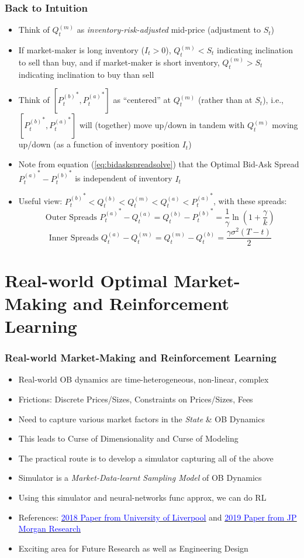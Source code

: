 \documentclass[handout]{beamer}
\begin{document}
\begin{frame}
\frametitle{Back to Intuition}
\pause
\begin{itemize}[<+->]
\item Think of $Q_t^{(m)}$ as {\em inventory-risk-adjusted} mid-price (adjustment to $S_t$)
\item If market-maker is long inventory ($I_t > 0$), $Q_t^{(m)} < S_t$ indicating inclination to sell than buy, and if market-maker is short inventory, $Q_t^{(m)} > S_t$ indicating inclination to buy than sell
\item Think of $[{P_t^{(b)}}^*, {P_t^{(a)}}^*]$ as ``centered'' at $Q_t^{(m)}$ (rather than at $S_t$), i.e., $[{P_t^{(b)}}^*, {P_t^{(a)}}^*]$ will (together) move up/down in tandem with $Q_t^{(m)}$ moving up/down (as a function of inventory position $I_t$)
\item Note from equation (\ref{eq:bidaskspreadsolve}) that the Optimal Bid-Ask Spread ${P_t^{(a)}}^* - {P_t^{(b)}}^*$ is independent of inventory $I_t$
\item Useful view: ${P_t^{(b)}}^* < Q_t^{(b)} < Q_t^{(m)} < Q_t^{(a)} < {P_t^{(a)}}^*$, with these spreads:
$$\mbox{ Outer Spreads } {P_t^{(a)}}^* - Q_t^{(a)} = Q_t^{(b)}  - {P_t^{(b)}}^* = \frac 1 {\gamma} \ln{(1 + \frac {\gamma} k)}$$
$$\mbox{ Inner Spreads } Q_t^{(a)} - Q_t^{(m)} = Q_t^{(m)} - Q_t^{(b)} = \frac {\gamma \sigma^2(T-t)} 2$$
\end{itemize}
\end{frame}


\section{Real-world Optimal Market-Making and Reinforcement Learning}

\begin{frame}
\frametitle{Real-world Market-Making and Reinforcement Learning}
\pause
\begin{itemize}[<+->]
\item Real-world OB dynamics are time-heterogeneous, non-linear, complex
\item Frictions: Discrete Prices/Sizes, Constraints on Prices/Sizes, Fees
\item Need to capture various market factors in the {\em State} \& OB Dynamics
\item This leads to Curse of Dimensionality and Curse of Modeling
\item The practical route is to develop a simulator capturing all of the above
\item Simulator is a {\em Market-Data-learnt Sampling Model} of OB Dynamics 
\item Using this simulator and neural-networks func approx, we can do RL
\item References: \href{https://arxiv.org/pdf/1804.04216.pdf}{\underline{\textcolor{blue}{2018 Paper from University of Liverpool}}} and 
\href{https://arxiv.org/pdf/1911.05892.pdf}{\underline{\textcolor{blue}{2019 Paper from JP Morgan Research}}}
\item Exciting area for Future Research as well as Engineering Design
\end{itemize}
\end{frame}
\end{document}
